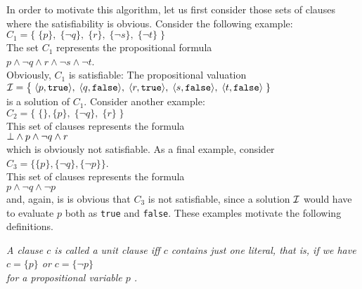 In order to motivate this algorithm, let us first consider those sets of clauses where the
satisfiability is obvious.  Consider the following example:
\\[0.2cm]
\hspace*{1.3cm} 
$C_1 = \bigl\{\; \{p\},\; \{\neg q\},\; \{r\},\; \{\neg s\}, \; \{\neg t\} \;\bigr\}$ 
\\[0.2cm]
The set $C_1$ represents the propositional formula
\\[0.2cm]
\hspace*{1.3cm}
$p \wedge \neg q \wedge r \wedge \neg s \wedge \neg t$.
\\[0.2cm]
Obviously,  $C_1$ is satisfiable: The propositional valuation  \\[0.2cm]
\hspace*{1.3cm} 
$\I = \bigl\{\; \pair(p, \mathtt{true}),\; \pair(q, \mathtt{false}),\;\pair(r, \mathtt{true}),\; \pair(s, \mathtt{false}),\; \pair(t, \mathtt{false})\;\}$
\\[0.2cm]
is a solution of $C_1$.  Consider another example: \\[0.2cm]
\hspace*{1.3cm} 
$C_2 = \bigl\{\; \{\}, \{p\},\; \{\neg q\},\; \{r\}\; \bigr\}$ 
\\[0.2cm]
This set of clauses represents the formula
\\[0.2cm]
\hspace*{1.3cm}
$\bot \wedge p \wedge \neg q \wedge r$
\\[0.2cm]
which is obviously not satisfiable.  As a final example, consider
\\[0.2cm]
\hspace*{1.3cm} $C_3 = \bigl\{ \{p\}, \{\neg q\}, \{\neg p\} \bigr\}$.
\\[0.2cm]
This set of clauses represents the formula
\\[0.2cm]
\hspace*{1.3cm}
$p \wedge \neg q \wedge \neg p $
\\[0.2cm]
and, again, is is obvious that $C_3$ is not satisfiable, since a solution $\mathcal{I}$ would have
to evaluate $p$ both as \texttt{true} and \texttt{false}.
These examples motivate the following definitions.


\begin{Definition}
{\em
  A clause $c$ is called a  \emph{unit clause} iff  $c$ contains just one literal,
  that is, if we have \\[0.2cm]
  \hspace*{1.3cm} $c = \{p\}$ \quad or \quad $c = \{\neg p\}$ \\[0.2cm]
  for a propositional variable $p$        .
}
\end{Definition}
\pagebreak

